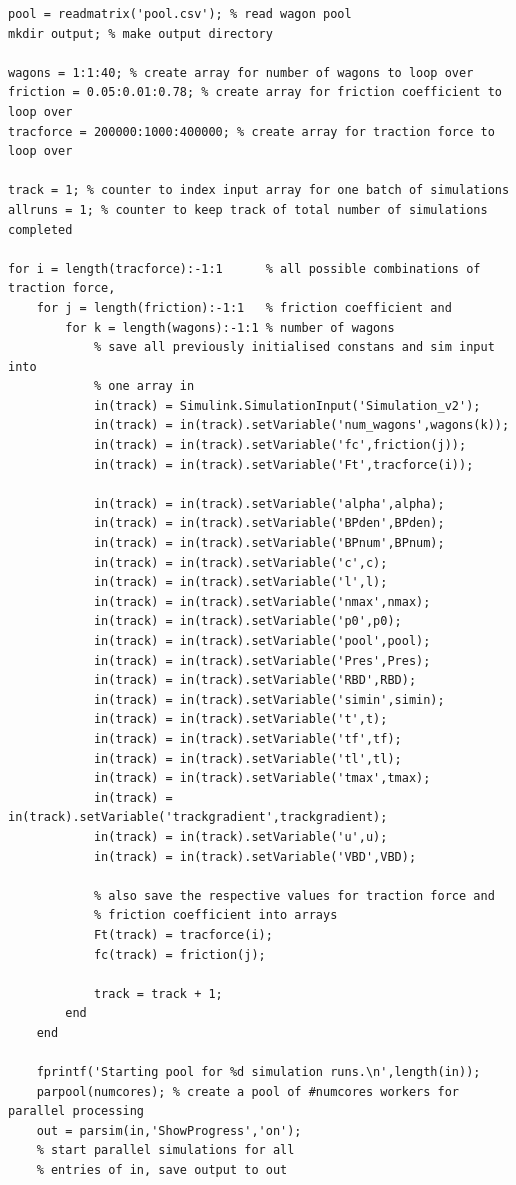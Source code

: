 \begin{lstlisting}
pool = readmatrix('pool.csv'); % read wagon pool
mkdir output; % make output directory

wagons = 1:1:40; % create array for number of wagons to loop over
friction = 0.05:0.01:0.78; % create array for friction coefficient to loop over
tracforce = 200000:1000:400000; % create array for traction force to loop over

track = 1; % counter to index input array for one batch of simulations
allruns = 1; % counter to keep track of total number of simulations completed

for i = length(tracforce):-1:1 		% all possible combinations of traction force,
	for j = length(friction):-1:1 	% friction coefficient and
		for k = length(wagons):-1:1 % number of wagons
			% save all previously initialised constans and sim input into
			% one array in
			in(track) = Simulink.SimulationInput('Simulation_v2');
			in(track) = in(track).setVariable('num_wagons',wagons(k));
			in(track) = in(track).setVariable('fc',friction(j));
			in(track) = in(track).setVariable('Ft',tracforce(i));
			
			in(track) = in(track).setVariable('alpha',alpha);
			in(track) = in(track).setVariable('BPden',BPden);
			in(track) = in(track).setVariable('BPnum',BPnum);
			in(track) = in(track).setVariable('c',c);
			in(track) = in(track).setVariable('l',l);
			in(track) = in(track).setVariable('nmax',nmax);
			in(track) = in(track).setVariable('p0',p0);
			in(track) = in(track).setVariable('pool',pool);
			in(track) = in(track).setVariable('Pres',Pres);
			in(track) = in(track).setVariable('RBD',RBD);
			in(track) = in(track).setVariable('simin',simin);
			in(track) = in(track).setVariable('t',t);
			in(track) = in(track).setVariable('tf',tf);
			in(track) = in(track).setVariable('tl',tl);
			in(track) = in(track).setVariable('tmax',tmax);
			in(track) = in(track).setVariable('trackgradient',trackgradient);
			in(track) = in(track).setVariable('u',u);
			in(track) = in(track).setVariable('VBD',VBD);
			
			% also save the respective values for traction force and
			% friction coefficient into arrays
			Ft(track) = tracforce(i);
			fc(track) = friction(j);
			
			track = track + 1;       
		end
	end
	
	fprintf('Starting pool for %d simulation runs.\n',length(in));
	parpool(numcores); % create a pool of #numcores workers for parallel processing
	out = parsim(in,'ShowProgress','on'); 	
	% start parallel simulations for all
	% entries of in, save output to out
											

\end{lstlisting}
